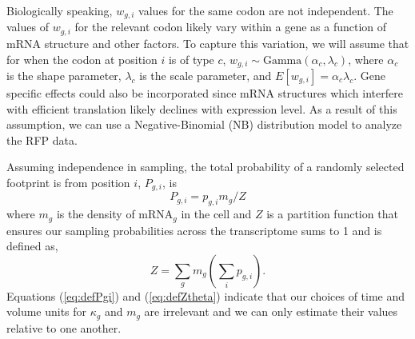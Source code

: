 \documentclass{article}
\newcommand{\waitTerm}{\ensuremath{w}\xspace}
\newcommand{\wgi}{\ensuremath{\waitTerm_{g,i}}\xspace}
\newcommand{\alphac}{\ensuremath{{\alpha_c}}\xspace}
\newcommand{\lambdac}{\ensuremath{{\lambda_c}}\xspace}
\newcommand{\pgi}{\ensuremath{{p_{g,i}}}\xspace}
\newcommand{\Pgi}{\ensuremath{{P_{g,i}}}\xspace}
\newcommand{\mg}{\ensuremath{{m_g}}\xspace}
\newcommand{\kappag}{\ensuremath{{\kappa_{g}}}\xspace}
\newcommand{\Ztheta}{\ensuremath{{Z}}\xspace}
\newcommand{\mRNAg}{mRNA$_g$\xspace}
\begin{document}
Biologically speaking, \wgi values for the same codon are not independent.
The values of \wgi for the relevant codon likely vary within a gene as a function of mRNA structure and other factors.
To capture this variation, we will assume that for when the codon at position $i$ is of type $c$, $\wgi \sim \text{Gamma}(\alphac, \lambdac)$, where \alphac is the shape parameter, \lambdac is the scale parameter, and $E[\wgi] = \alphac \lambdac$.
Gene specific effects could also be incorporated since  mRNA structures which interfere with efficient translation likely declines with expression level.
As a result of this assumption, we can use a Negative-Binomial (NB) distribution model to analyze the RFP data.


Assuming independence in sampling, the total probability of a randomly selected footprint is from position $i$, $\Pgi$, is
\begin{equation} \label{eq:defPgi}
\Pgi = \pgi \mg/\Ztheta 
\end{equation}
where \mg is the density of \mRNAg in the cell and \Ztheta is a partition function that ensures our sampling probabilities across the transcriptome sums to 1 and is defined as,
\begin{equation}
  \label{eq:defZtheta}
  \Ztheta = \sum_g \mg \left(\sum_i \pgi\right).
\end{equation}
Equations (\ref{eq:defPgi}) and (\ref{eq:defZtheta}) indicate that our choices of time and volume units for \kappag and \mg are irrelevant and we can only estimate their values relative to one another.

\end{document}
